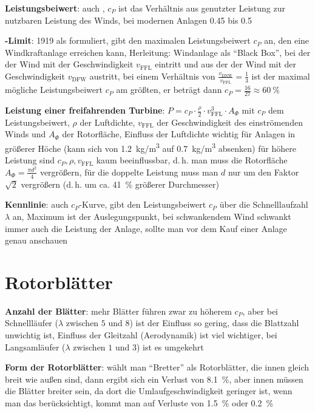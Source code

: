 \linie

\textbf{Leistungsbeiwert}:
auch , $c_P$ ist das Verhältnis aus genutzter Leistung zur nutzbaren Leistung
des Winds,
bei modernen Anlagen \num{0.45} bis \num{0.5}

\textbf{-Limit}:
1919 als  formuliert,
gibt den maximalen Leistungsbeiwert $c_P$ an, den eine Windkraftanlage erreichen kann,
Herleitung: Windanlage als "`Black Box"', bei der der Wind mit der Geschwindigkeit $v_{\text{FFL}}$
eintritt und aus der der Wind mit der Geschwindigkeit $v_{\text{DFW}}$ austritt, bei einem
Verhältnis von $\frac{v_{\text{DNW}}}{v_{\text{FFL}}} = \frac{1}{3}$ ist der maximal mögliche
Leistungsbeiwert $c_P$ am größten, er beträgt dann $c_P = \frac{16}{27} \approx \SI{60}{\percent}$

\textbf{Leistung einer freifahrenden Turbine}:
$P = c_P \cdot \frac{\rho}{2} \cdot v_{\text{FFL}}^3 \cdot A_\Phi$
mit $c_P$ dem Leistungsbeiwert,
$\rho$ der Luftdichte,
$v_{\text{FFL}}$ der Geschwindigkeit des einströmenden Winds und
$A_\Phi$ der Rotorfläche,
Einfluss der Luftdichte wichtig für Anlagen in größerer Höche
(kann sich von \SI{1.2}{\kilogram/\meter\cubed} auf \SI{0.7}{\kilogram/\meter\cubed} absenken)
für höhere Leistung sind $c_P, \rho, v_{\text{FFL}}$ kaum beeinflussbar, d.\,h.
man muss die Rotorfläche $A_\Phi = \frac{\pi d^2}{4}$ vergrößern,
für die doppelte Leistung muss man $d$ nur um den Faktor $\sqrt{2}$ vergrößern
(d.\,h. um ca. \SI{41}{\percent} größerer Durchmesser)

\textbf{Kennlinie}:
auch $c_P$-Kurve,
gibt den Leistungsbeiwert $c_P$ über die Schnelllaufzahl $\lambda$ an,
Maximum ist der Auslegungspunkt,
bei schwankendem Wind schwankt immer auch die Leistung der Anlage,
sollte man vor dem Kauf einer Anlage genau anschauen

\section{%
    Rotorblätter%
}

\textbf{Anzahl der Blätter}:
mehr Blätter führen zwar zu höherem $c_P$,
aber bei Schnellläufer ($\lambda$ zwischen $5$ und $8$) ist der Einfluss so gering,
dass die Blattzahl unwichtig ist, Einfluss der Gleitzahl (Aerodynamik) ist viel wichtiger,
bei Langsamläufer ($\lambda$ zwischen $1$ und $3$) ist es umgekehrt

\textbf{Form der Rotorblätter}:
wählt man "`Bretter"' als Rotorblätter, die innen gleich breit wie außen sind,
dann ergibt sich ein Verlust von \SI{8.1}{\percent},
aber innen müssen die Blätter breiter sein, da dort die Umlaufgeschwindigkeit geringer ist,
wenn man das berücksichtigt, kommt man auf Verluste von \SI{1.5}{\percent} oder \SI{0.2}{\percent}


